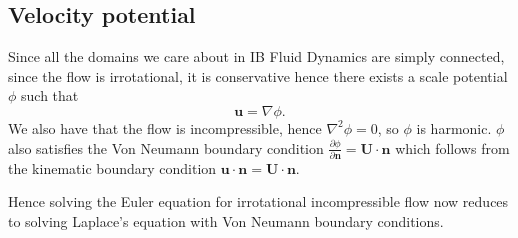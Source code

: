 \documentclass{article}
\begin{document}
\subsection{Velocity potential}
Since all the domains we care about in IB Fluid Dynamics are simply connected, since the flow is irrotational, it is conservative hence there exists a scale potential $ \phi $ such that
\[
  \mathbf u = \nabla \phi.
\]
We also have that the flow is incompressible, hence $ \nabla^2 \phi = 0 $, so $ \phi $ is harmonic. $ \phi $ also satisfies the Von Neumann boundary condition $ \frac{\partial \phi}{\partial \mathbf n } = \mathbf U\cdot \mathbf n $ which follows from the kinematic boundary condition $ \mathbf u \cdot\mathbf n = \mathbf U \cdot\mathbf n $.\par
Hence solving the Euler equation for irrotational incompressible flow now reduces to solving Laplace's equation with Von Neumann boundary conditions. 
\end{document}
